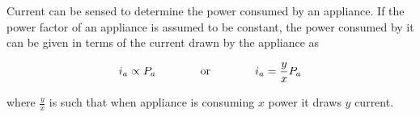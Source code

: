 Current can be sensed to determine the power consumed by an appliance. If the power factor of an appliance is assumed to be constant, the power consumed by it can be given in terms of the current drawn by the appliance as 

\begin{equation}
\label{eq:currentValue}
i_a \propto P_a \hspace{.5in} \text{ or } \hspace{0.5in} i_a = \frac{y}{x} P_a 
\end{equation}


where $\frac{y}{x}$ is such that when appliance is consuming $x$ power it draws $y$ current. 

 	
